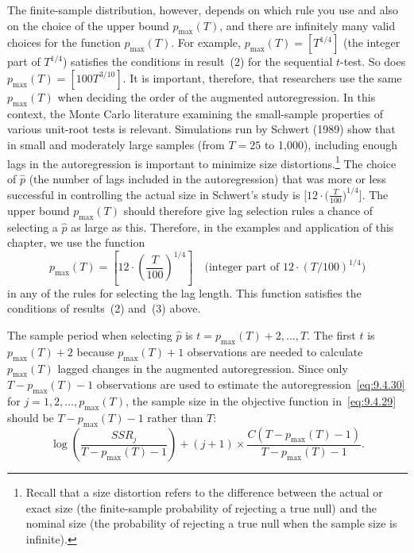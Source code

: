 The finite-sample distribution, however, depends on which rule you use and also
on the choice of the upper bound $p_{\max}(T)$, and there are infinitely many valid
choices for the function $p_{\max}(T)$. For example, $p_{\max}(T) = [T^{1/4}]$ (the integer
part of $T^{1/4}$) satisfies the conditions in result~(2) for the sequential $t$-test. So does
$p_{\max}(T) = [100 T^{3/10}]$. It is important, therefore, that researchers use the same
$p_{\max}(T)$ when deciding the order of the augmented autoregression. In this context,
the Monte Carlo literature examining the small-sample properties of various unit-root tests is relevant. Simulations run by Schwert (1989) show that in small and
moderately large samples (from $T = 25$ to 1,000), including enough lags in the
autoregression is important to minimize size distortions.\footnote{Recall that a size distortion refers to the difference between the actual or exact size (the finite-sample probability of rejecting a true null) and the nominal size (the probability of rejecting a true null when the sample size
is infinite).} The choice of $\hat{p}$ (the
number of lags included in the autoregression) that was more or less successful in
controlling the actual size in Schwert's study is $\big[12 \cdot \big(\frac{T}{100}\big)^{1/4}\big]$. The upper bound
$p_{\max}(T)$ should therefore give lag selection rules a chance of selecting a $\hat{p}$ as large
as this. Therefore, in the examples and application of this chapter, we use the function
\begin{equation}
\label{eq:9.4.31}
p_{\max}(T) = \left[12 \cdot \left(\frac{T}{100}\right)^{1/4}\right]
\quad \text{(integer part of $12 \cdot (T/100)^{1/4}$)}
\end{equation}
in any of the rules for selecting the lag length. This function satisfies the conditions
of results~(2) and~(3) above.

The sample period when selecting $\hat{p}$ is $t = p_{\max}(T) + 2, \ldots, T$.
The first $t$ is $p_{\max}(T) + 2$ because $p_{\max}(T) + 1$ observations are needed to calculate $p_{\max}(T)$ lagged changes in the augmented autoregression. Since only $T -
p_{\max}(T) - 1$ observations are used to estimate the autoregression~\eqref{eq:9.4.30} for $j =
1, 2, \ldots, p_{\max}(T)$, the sample size in the objective function in~\eqref{eq:9.4.29} should be
$T - p_{\max}(T) - 1$ rather than $T$:
\begin{equation}
\label{eq:9.4.32}
\log\!\left(\frac{SSR_j}{T - p_{\max}(T) - 1}\right)
+ (j + 1) \times \frac{C(T - p_{\max}(T) - 1)}{T - p_{\max}(T) - 1}.
\end{equation}

